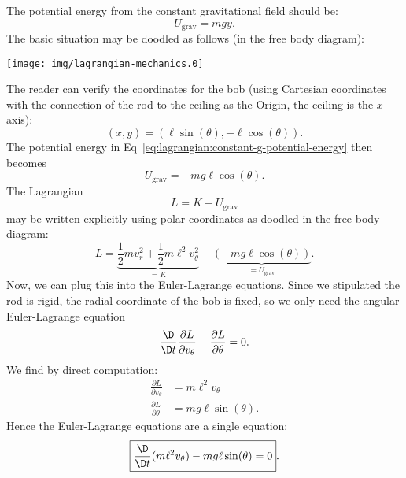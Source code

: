 The potential energy from the constant gravitational field should be:
\begin{equation}\label{eq:lagrangian:constant-g-potential-energy}
U_{\text{grav}} = mgy.
\end{equation}
The basic situation may be doodled as follows (in the free body diagram):
\begin{center}
\texttt{[image: img/lagrangian-mechanics.0]}
\end{center}
The reader can verify the coordinates for the bob (using Cartesian
coordinates with the connection of the rod to the ceiling as the Origin,
the ceiling is the $x$-axis):
\begin{equation}
(x,y) = (\ell\sin(\theta),-\ell\cos(\theta)).
\end{equation}
The potential energy in Eq~\eqref{eq:lagrangian:constant-g-potential-energy}
then becomes
\begin{equation}
U_{\text{grav}} = -mg\ell\cos(\theta).
\end{equation}
The Lagrangian
\begin{equation}
L = K - U_{\text{grav}}
\end{equation}
may be written explicitly using polar coordinates as doodled in the
free-body diagram:
\begin{equation}
\boxed{L = \underbrace{\frac{1}{2}mv_{r}^{2} + \frac{1}{2}m\ell^{2}v_{\theta}^{2}}_{=K}
-\underbrace{(-mg\ell\cos(\theta))}_{=U_{\text{grav}}}.}
\end{equation}
Now, we can plug this into the Euler-Lagrange equations. Since we
stipulated the rod is rigid, the radial coordinate of the bob is fixed,
so we only need the angular Euler-Lagrange equation
\begin{equation}
\frac{\D}{\D t}\frac{\partial L}{\partial v_{\theta}} - \frac{\partial L}{\partial\theta}=0.
\end{equation}
We find by direct computation:
\begin{subequations}
\begin{align}
\frac{\partial L}{\partial v_{\theta}} &= m\ell^{2}v_{\theta}\\
\frac{\partial L}{\partial\theta} &= mg\ell\sin(\theta).
\end{align}
\end{subequations}
Hence the Euler-Lagrange equations are a single equation:
\begin{equation}\label{lagrangian:simple-pendulum:eom}
\boxed{\frac{\D}{\D t}(m\ell^{2}v_{\theta}) - mg\ell\sin(\theta) = 0}.
\end{equation}

